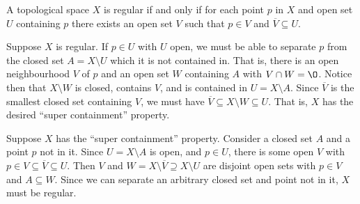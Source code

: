 \documentclass[12 pt, letterpaper]{hmcpset}
\begin{document}
\begin{problem}[4.8]
	A topological space $X$ is regular if and only if for each point $p$ in $X$ and open set $U$ containing $p$ there exists an open set $V$ such that $p \in V$ and $\overline{V} \subseteq U$.
\end{problem}

\begin{solution}
	Suppose $X$ is regular. If $p \in U$ with $U$ open, we must be able to separate $p$ from the closed set ${A = X \setminus U}$ which it is not contained in. That is, there is an open neighbourhood $V$ of $p$ and an open set $W$ containing $A$ with $V \cap W = \O$. Notice then that ${X \setminus W}$ is closed, contains $V$, and is contained in $U = {X \setminus A}$. Since $\overline{V}$ is the smallest closed set containing $V$, we must have $\overline{V} \subseteq {X \setminus W} \subseteq U$. That is, $X$ has the desired ``super containment'' property. 

	Suppose $X$ has the ``super containment'' property. Consider a closed set $A$ and a point $p$ not in it. Since $U = X \setminus A$ is open, and $p \in U$, there is some open $V$ with $p \in V \subseteq \overline{V} \subseteq U$. Then $V$ and $W = {X \setminus \overline{V}} \supseteq {X \setminus U}$ are disjoint open sets with $p \in V$ and $A \subseteq W$. Since we can separate an arbitrary closed set and point not in it, $X$ must be regular.
\end{solution}
\end{document}
